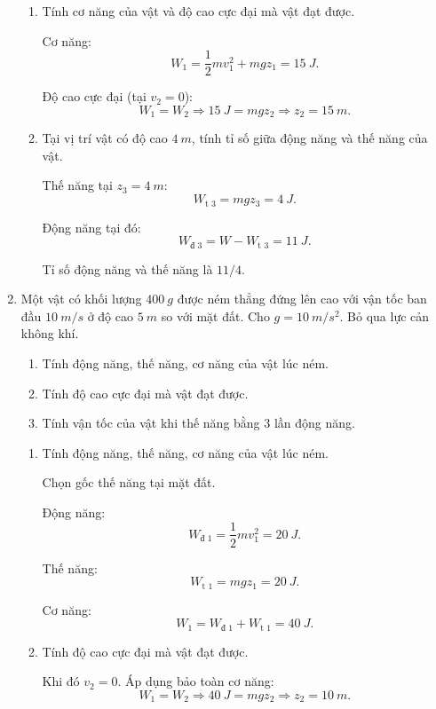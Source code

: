 \begin{enumerate}[label=\bfseries Câu \arabic*:]
	\hideall
	{	
			\begin{enumerate}[label=\alph*)]
			\item Tính cơ năng của vật và độ cao cực đại mà vật đạt được.
			
			Cơ năng: $$W_1=\dfrac{1}{2}mv_1^2 + mgz_1 = \SI{15}{J}.$$
			
			Độ cao cực đại (tại $v_2 = 0$):
			$$W_1 = W_2 \Rightarrow \SI{15}{J} = mgz_2 \Rightarrow z_2 = \SI{15}{m}.$$
			
			\item Tại vị trí vật có độ cao $\SI{4}{m}$, tính tỉ số giữa động năng và thế năng của vật.
			
			Thế năng tại $z_3=\SI{4}{m}$:
			$$W_\text{t 3} = mgz_3 = \SI{4}{J}.$$
			
			Động năng tại đó:
			$$W_\text{đ 3} = W - W_\text{t 3} = \SI{11}{J}.$$
			
			Tỉ số động năng và thế năng là $11/4$.
		\end{enumerate}
	}
	\item {}
	
	
	{
		Một vật có khối lượng $\SI{400}{g}$ được ném thẳng đứng lên cao với vận tốc ban đầu $\SI{10}{m/s}$ ở độ cao $\SI{5}{m}$ so với mặt đất. Cho $g=\SI{10}{m/s^2}$. Bỏ qua lực cản không khí.
		\begin{enumerate}[label=\alph*)]
			\item Tính động năng, thế năng, cơ năng của vật lúc ném.
			\item Tính độ cao cực đại mà vật đạt được.
			\item Tính vận tốc của vật khi thế năng bằng 3 lần động năng.
		\end{enumerate}
		
	}
	
	\hideall
	{	
			\begin{enumerate}[label=\alph*)]
			\item Tính động năng, thế năng, cơ năng của vật lúc ném.
			
			Chọn gốc thế năng tại mặt đất.
			
			Động năng:
			$$W_\text{đ 1} = \dfrac{1}{2} mv_1^2  =\SI{20}{J}.$$
			
			Thế năng:
			$$W_\text{t 1} = mgz_1 = \SI{20}{J}.$$
			
			Cơ năng:
			$$W_1 = W_\text{đ 1} + W_\text{t 1} = \SI{40}{J}.$$
			
			\item Tính độ cao cực đại mà vật đạt được.
			
			Khi đó $v_2 = 0$. Áp dụng bảo toàn cơ năng:
			$$W_1 = W_2 \Rightarrow \SI{40}{J} = mgz_2 \Rightarrow z_2 = \SI{10}{m}.$$
			

\end{enumerate}}
\end{enumerate}
